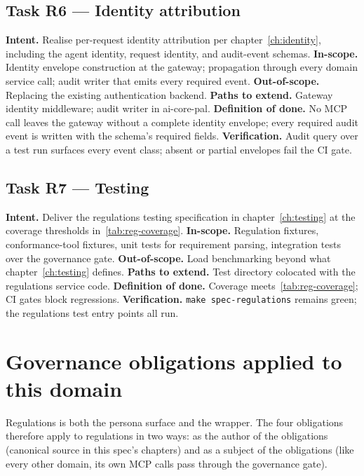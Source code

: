 \subsection*{Task R6 --- Identity attribution}
\textbf{Intent.} Realise per-request identity attribution per
chapter~\ref{ch:identity}, including the agent identity, request
identity, and audit-event schemas.
\textbf{In-scope.} Identity envelope construction at the gateway;
propagation through every domain service call; audit writer that
emits every required event.
\textbf{Out-of-scope.} Replacing the existing authentication
backend.
\textbf{Paths to extend.} Gateway identity middleware; audit writer
in ai-core-pal.
\textbf{Definition of done.} No MCP call leaves the gateway without
a complete identity envelope; every required audit event is written
with the schema's required fields.
\textbf{Verification.} Audit query over a test run surfaces every
event class; absent or partial envelopes fail the CI gate.

\subsection*{Task R7 --- Testing}
\textbf{Intent.} Deliver the regulations testing specification in
chapter~\ref{ch:testing} at the coverage thresholds
in~\ref{tab:reg-coverage}.
\textbf{In-scope.} Regulation fixtures, conformance-tool fixtures,
unit tests for requirement parsing, integration tests over the
governance gate.
\textbf{Out-of-scope.} Load benchmarking beyond what
chapter~\ref{ch:testing} defines.
\textbf{Paths to extend.} Test directory colocated with the
regulations service code.
\textbf{Definition of done.} Coverage meets~\ref{tab:reg-coverage};
CI gates block regressions.
\textbf{Verification.} \texttt{make spec-regulations} remains green;
the regulations test entry points all run.


\section{Governance obligations applied to this domain}
\label{sec:agent-governance}
Regulations is both the persona surface and the wrapper. The four
obligations therefore apply to regulations in two ways: as the
author of the obligations (canonical source in this spec's chapters)
and as a subject of the obligations (like every other domain, its
own MCP calls pass through the governance gate).

